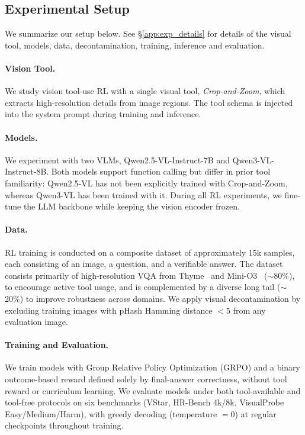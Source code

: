 \subsection{Experimental Setup}
\label{sec:setup}
%
We summarize our setup below. See \S\ref{app:exp_details} for details of the visual tool, models, data, decontamination, training, inference and evaluation.

\paragraph{Vision Tool.}
%
We study vision tool-use RL with a single visual tool,
\textit{Crop-and-Zoom}, which extracts high-resolution details from image regions.
The tool schema is injected into the system prompt during training and inference.

\paragraph{\textbf{Models.}}
%
We experiment with two VLMs, Qwen2.5-VL-Instruct-7B and Qwen3-VL-Instruct-8B.
Both models support function calling but differ in prior tool familiarity:
Qwen2.5-VL has not been explicitly trained with Crop-and-Zoom,
whereas Qwen3-VL has been trained with it.
During all RL experiments, we fine-tune the LLM backbone while keeping the vision encoder frozen.

\paragraph{Data.}
%
RL training is conducted on a composite dataset of approximately 15k samples,
each consisting of an image, a question, and a verifiable answer.
%
The dataset consists primarily of high-resolution VQA from Thyme~\cite{zhangThymeThinkBeyond2025} and Mini-O3~\cite{laiMinio3ScalingUp2025} ($\sim$80\%),
to encourage active tool usage, and is complemented by a diverse long tail ($\sim$20\%)
to improve robustness across domains.
%
We apply visual decontamination by excluding training images
with pHash Hamming distance $<5$ from any evaluation image.

\paragraph{Training and Evaluation.}
%
We train models with Group Relative Policy Optimization (GRPO)
and a binary outcome-based reward defined solely by final-answer correctness,
without tool reward or curriculum learning.
%
We evaluate models under both tool-available and tool-free protocols
on six benchmarks (VStar, HR-Bench 4k/8k, VisualProbe Easy/Medium/Harm),
with greedy decoding (temperature $=0$) at regular checkpoints throughout training.

